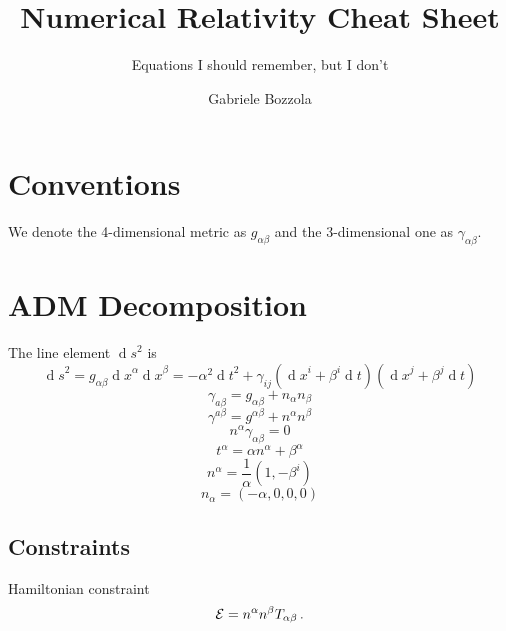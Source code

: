 \documentclass[]{scrartcl}
\author{Gabriele Bozzola}
\title{Numerical Relativity Cheat Sheet}
\date{}
\subtitle{Equations I should remember, but I don't}
\renewcommand{\d}[1]{\ensuremath{\operatorname{d}\!{#1}}}
\begin{document}
\maketitle
\tableofcontents

\section{Conventions}
\label{sec:conventions}

We denote the 4-dimensional metric as $g_{\alpha\beta}$ and the 3-dimensional one as
$\gamma_{\alpha\beta}$.

\section{ADM Decomposition}
\label{sec:adm-decomposition}

The line element $\d s^2$ is
\begin{equation}
  \label{eq:2}
  \d s^2 = g_{\alpha\beta} \d x^\alpha \d x^\beta = - \alpha^2 \d t^2 + \gamma_{ij} (\d x^i + \beta^i \d t) (\d x^j + \beta^j \d t)
\end{equation}
\begin{equation}
  \label{eq:11}
  \gamma_{a\beta} = g_{\alpha\beta} + n_\alpha n_\beta
\end{equation}
\begin{equation}
  \label{eq:11}
  \gamma^{a\beta} = g^{\alpha\beta} + n^\alpha n^\beta
\end{equation}
\begin{equation}
  \label{eq:12}
  n^\alpha \gamma_{\alpha\beta} = 0
\end{equation}
\begin{equation}
  \label{eq:16}
  t^\alpha = \alpha n^\alpha + \beta^\alpha
\end{equation}
\begin{equation}
  \label{eq:4}
  n^\alpha = \frac{1}{\alpha} (1, - \beta^i)
\end{equation}
\begin{equation}
  \label{eq:5}
  n_\alpha = (-\alpha,0,0,0)
\end{equation}

\subsection{Constraints}
\label{sec:constraints}

Hamiltonian constraint
\begin{equation}
  \label{eq:18}
  {\cal E} = n^\alpha n^\beta T_{\alpha\beta}\,.
\end{equation}
\end{document}
